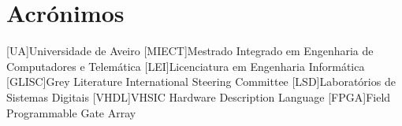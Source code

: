 \documentclass{report}
\begin{document}
\chapter*{Acrónimos}
\begin{acronym}
[UA]{Universidade de Aveiro}
[MIECT]{Mestrado Integrado em Engenharia de Computadores e Telemática}
[LEI]{Licenciatura em Engenharia Informática}
[GLISC]{Grey Literature International Steering Committee}
[LSD]{Laboratórios de Sistemas Digitais}
[VHDL]{VHSIC Hardware Description Language}
[FPGA]{Field Programmable Gate Array}
\end{acronym}


\printbibliography
\end{document}

